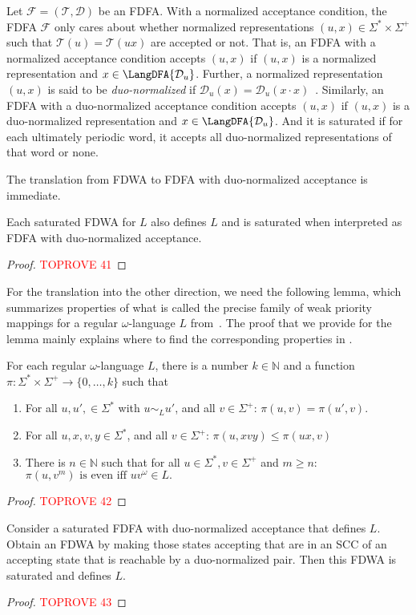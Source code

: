 \documentclass[a4paper,USenglish,cleveref,autoref,thm-restate]{lipics-v2021}
\newcommand{\mc}[1]{\ensuremath{\mathcal{#1}}}
\newcommand{\T}{\mc{T}}
\newcommand{\F}{\mc{F}}
\newcommand{\D}{\mc{D}}
\begin{document}
{Let $\F = (\T, \D)$ be an FDFA.
With a normalized acceptance condition, the FDFA $\F$ only cares about whether normalized representations $(u, x) \in \Sigma^*\times \Sigma^+$ such that $\T(u) = \T(ux)$ are accepted or not.
That is, an FDFA with a normalized acceptance condition accepts $(u, x)$ if $(u, x)$ is a normalized representation and $x \in \LangDFA{\D_u}$.
Further, a normalized representation $(u, x)$ is said to be \emph{duo-normalized} if $\D_u(x) = \D_u(x\cdot x)$~\cite{FismanGZ24}.
Similarly, an FDFA with a duo-normalized acceptance condition accepts $(u, x)$ if $(u, x)$ is a duo-normalized representation and $x \in \LangDFA{\D_u}$. And it is saturated if for each ultimately periodic word, it accepts all duo-normalized representations of that word or none. 

The translation from FDWA to FDFA with duo-normalized acceptance is immediate.
\begin{lemma}
Each saturated FDWA for $L$ also defines $L$ and is saturated when interpreted as FDFA with duo-normalized acceptance.
\end{lemma}
\begin{proof}\textcolor{red}{TOPROVE 41}\end{proof}

For the translation into the other direction, we need the following lemma, which summarizes properties of what is called the precise family of weak priority mappings for a regular $\omega$-language $L$ from~\cite{BohnL24}. The proof that we provide for the lemma mainly explains where to find the corresponding properties in \cite{BohnL24}.

\begin{lemma}\label{lem:precise-mapping}
  For each regular $\omega$-language $L$, there is a number $k \in \mathbb{N}$ and a function $\pi: \Sigma^* \times \Sigma^+ \rightarrow \{0,\ldots,k\}$ such that
  \begin{enumerate}
  \item For all $u,u',\in \Sigma^*$ with $u \sim_L u'$, and all $v \in \Sigma^+$:\; $\pi(u,v) = \pi(u',v)$.
  \item For all $u,x,v,y \in \Sigma^*$, and all $v \in \Sigma^+$:\; $\pi(u,xvy) \le \pi(ux,v)$
  \item There is $n \in \mathbb{N}$ such that for all $u \in \Sigma^*, v \in \Sigma^+$ and $m \ge n$:\;
$
\pi(u,v^m) \text{ is even iff $uv^\omega \in L$.}
$
  \end{enumerate}
\end{lemma}
\begin{proof}\textcolor{red}{TOPROVE 42}\end{proof}


\begin{lemma}
Consider a saturated FDFA with duo-normalized acceptance that defines $L$. Obtain an FDWA by making those states accepting that are in an SCC of an accepting state that is reachable by a duo-normalized pair. Then this FDWA is saturated and defines $L$.
\end{lemma}
\begin{proof}\textcolor{red}{TOPROVE 43}\end{proof}

 }
\end{document}
